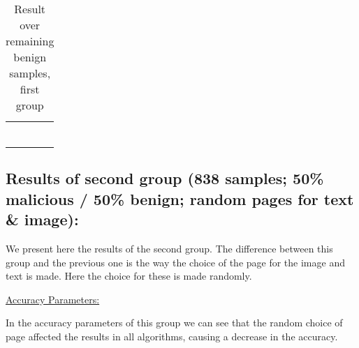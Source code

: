 \documentclass{article}
\begin{document}
\begin{table}[htb]
\centering
\begin{tabular}{|M{4.0cm}|M{2.0cm}|M{2.0cm}|M{2.0cm}|}
	\hline
	\centering{} &  &  & \tabularnewline
	\hline
	 &  &  &  \tabularnewline
	\hline
	 &  &  & \tabularnewline
	\hline
	 &  &  & \tabularnewline
	\hline
	 &  &  & \tabularnewline
	\hline
	 &  &  & \tabularnewline
	\hline
	 &  &  & \tabularnewline
	\hline
\end{tabular}
\caption{Result over remaining benign samples, first group}
\end{table}

\subsection{Results of second group (838 samples; 50\% malicious / 50\% benign; random pages for text \& image):}
\indent We present here the results of the second group. The difference between this group and the previous one is the way the choice of the page for the image and text is made. Here the choice for these is made randomly.

\noindent\underline{Accuracy Parameters:}

\indent	In the accuracy parameters of this group we can see that the random choice of page affected the results in all algorithms, causing a decrease in the accuracy.
\end{document}
